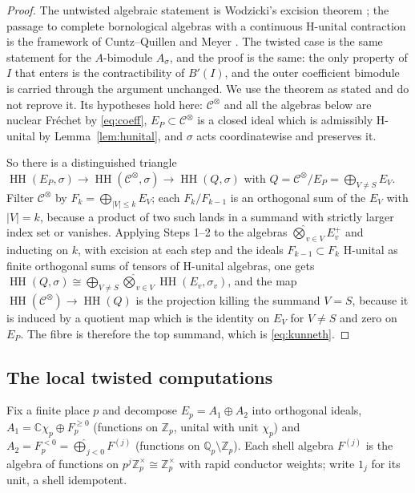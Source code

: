 \documentclass[11pt]{amsart}
\theoremstyle{definition}
\theoremstyle{remark}
\newcommand{\C}{\mathbb C}
\newcommand{\Z}{\mathbb Z}
\newcommand{\Q}{\mathbb Q}
\newcommand{\HH}{\operatorname{HH}}
\begin{document}
\begin{proof}
The untwisted algebraic statement is Wodzicki's excision theorem
\cite{Wodzicki}; the passage to complete bornological algebras with a
continuous H-unital contraction is the framework of Cuntz--Quillen
\cite{CuntzQuillen} and Meyer \cite{MeyerCyclic}.  The twisted case is the
same statement for the $A$-bimodule $A_{\sigma}$, and the proof is the same:
the only property of $I$ that enters is the contractibility of $B'(I)$, and
the outer coefficient bimodule is carried through the argument unchanged.  We
use the theorem as stated and do not reprove it.  Its hypotheses hold here: $\mathcal C^{\otimes}$ and all the algebras below are nuclear Fr\'echet
by \eqref{eq:coeff}, $E_P\subset\mathcal C^{\otimes}$ is a closed ideal which
is admissibly H-unital by Lemma~\ref{lem:hunital}, and $\sigma$ acts
coordinatewise and preserves it.

So there is a distinguished triangle
$\HH(E_P,\sigma)\to\HH(\mathcal C^{\otimes},\sigma)\to\HH(Q,\sigma)$ with
$Q=\mathcal C^{\otimes}/E_P=\bigoplus_{V\ne S}E_V$.  Filter $\mathcal C^{\otimes}$ by $F_k=\bigoplus_{|V|\le k}E_V$; each
$F_k/F_{k-1}$ is an orthogonal sum of the $E_V$ with $|V|=k$, because a product
of two such lands in a summand with strictly larger index set or vanishes.
Applying Steps 1--2 to the algebras $\widehat\bigotimes_{v\in V}E_v^{+}$ and
inducting on $k$, with excision at each step and the ideals $F_{k-1}\subset
F_k$ H-unital as finite orthogonal sums of tensors of H-unital algebras, one
gets $\HH(Q,\sigma)\cong\bigoplus_{V\ne S}\widehat\bigotimes_{v\in
V}\HH(E_v,\sigma_v)$, and the map
$\HH(\mathcal C^{\otimes})\to\HH(Q)$ is the projection killing the summand
$V=S$, because it is induced by a quotient map which is the identity on $E_V$
for $V\ne S$ and zero on $E_P$.  The fibre is therefore the top summand, which
is \eqref{eq:kunneth}.
\end{proof}

\subsection{The local twisted computations}

Fix a finite place $p$ and decompose $E_p=A_1\oplus A_2$ into orthogonal
ideals, $A_1=\C\chi_p\oplus F_p^{\ge0}$ (functions on $\Z_p$, unital with unit
$\chi_p$) and $A_2=F_p^{<0}=\widehat\bigoplus_{j<0}F^{(j)}$ (functions on
$\Q_p\setminus\Z_p$).  Each shell algebra $F^{(j)}$ is the algebra of functions
on $p^{j}\Z_p^{\times}\cong\Z_p^{\times}$ with rapid conductor weights; write
$1_j$ for its unit, a shell idempotent.
\end{document}
